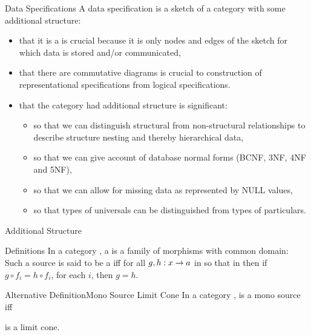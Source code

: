 \begin{frame}{Data Specifications}
A data specification is a sketch of a category with some additional structure:
\begin{itemize}
\item that it is a  is crucial because it is only nodes and edges of the sketch for which data is stored and/or communicated, 
\item that there are commutative diagrams is crucial to construction of representational 
specifications from logical specifications.
\item that the category had additional structure is significant:
\begin{itemize}
\item so that we can distinguish structural from non-structural relationships to describe structure nesting and thereby hierarchical data,
\item so that we can give account of database normal forms 
(BCNF, 3NF, 4NF and 5NF),
\item so that we can allow for missing data as represented by NULL values, 
\item so that types of universals can be distinguished from types of particulars.
\end{itemize}
\end{itemize}
\end{frame}

\begin{frame}{Additional Structure}
\resizebox{11.3cm}{!}{

\featurelist
}
\end{frame}

\begin{frame}{Definitions} 
In a category \catc, a   is a family of morphisms with common domain: \\
\medskip
Such a source is said to be a   iff for all $g,h:x \rightarrow a$ in \catcw 
so that  
in \catcw then if $g \circ f_i = h \circ f_i$, for each $i$,  then $g=h$.
\end{frame}

\begin{frame}{Alternative Definition}{Mono Source Limit Cone}  
In a category ,
\scalebox{0.65}{

} is a mono source iff \\
\begin{center}
\scalebox{0.65}{

} 
is a limit cone.
\end{center}
\end{frame}

